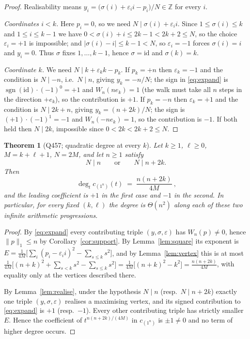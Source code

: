 \documentclass[11pt]{article}
\theoremstyle{plain}
\newtheorem{theorem}{Theorem}[section]
\theoremstyle{definition}
\theoremstyle{remark}
\newcommand{\Z}{\mathbb{Z}}
\newcommand{\onen}{(1^{n})}
\begin{document}
\begin{proof}
Realisability means $y_i=\bigl(\sigma(i)+\varepsilon_i i-p_i\bigr)/N\in\Z$ for every $i$.

\emph{Coordinates $i<k$.} Here $p_i=0$, so we need $N\mid\sigma(i)+\varepsilon_i i$.
Since $1\le\sigma(i)\le k$ and $1\le i\le k-1$ we have
$0<\sigma(i)+i\le 2k-1<2k+2\le N$, so the choice $\varepsilon_i=+1$ is impossible;
and $|\sigma(i)-i|\le k-1<N$, so $\varepsilon_i=-1$ forces $\sigma(i)=i$ and $y_i=0$.
Thus $\sigma$ fixes $1,\dots,k-1$, hence $\sigma=\mathrm{id}$ and $\sigma(k)=k$.

\emph{Coordinate $k$.} We need $N\mid k+\varepsilon_k k-p_k$.
If $p_k=+n$ then $\varepsilon_k=-1$ and the condition is $N\mid -n$, i.e.\ $N\mid n$,
giving $y_k=-n/N$; the sign in \eqref{eq:expand} is
$\operatorname{sgn}(\mathrm{id})\cdot(-1)^{0}=+1$ and $W_n(n e_k)=1$ (the walk must take
all $n$ steps in the direction $+e_k$), so the contribution is $+1$.
If $p_k=-n$ then $\varepsilon_k=+1$ and the condition is $N\mid 2k+n$, giving
$y_k=(n+2k)/N$; the sign is $(+1)\cdot(-1)^{1}=-1$ and $W_n(-ne_k)=1$, so the
contribution is $-1$.
If both held then $N\mid 2k$, impossible since $0<2k<2k+2\le N$.
\end{proof}

\begin{theorem}[Q457; quadratic degree at every $k$]\label{thm:B}
Let $k\ge1$, $\ell\ge0$, $M=k+\ell+1$, $N=2M$, and let $n\ge1$ satisfy
\[
  N\mid n\qquad\text{or}\qquad N\mid n+2k .
\]
Then
\[
  \boxed{\ \deg_t c_\onen(t)\;=\;\frac{n(n+2k)}{4M}\ },
\]
and the leading coefficient is $+1$ in the first case and $-1$ in the second. In
particular, for every fixed $(k,\ell)$ the degree is $\Theta(n^2)$ along each of these two
infinite arithmetic progressions.
\end{theorem}

\begin{proof}
By \eqref{eq:expand} every contributing triple $(y,\sigma,\varepsilon)$ has
$W_n(p)\ne0$, hence $\|p\|_1\le n$ by Corollary~\ref{cor:support}. By
Lemma~\ref{lem:square} its exponent is
$E=\frac1{4M}\bigl[\sum_i(p_i-\varepsilon_i i)^2-\sum_{s\le k}s^2\bigr]$, and by
Lemma~\ref{lem:vertex} this is at most
$\frac1{4M}\bigl[(n+k)^2+\sum_{s<k}s^2-\sum_{s\le k}s^2\bigr]
=\frac1{4M}\bigl[(n+k)^2-k^2\bigr]=\frac{n(n+2k)}{4M}$,
with equality only at the vertices described there.

By Lemma~\ref{lem:realise}, under the hypothesis $N\mid n$ (resp.\ $N\mid n+2k$) exactly
one triple $(y,\sigma,\varepsilon)$ realises a maximising vertex, and its signed
contribution to \eqref{eq:expand} is $+1$ (resp.\ $-1$). Every other contributing triple
has strictly smaller $E$. Hence the coefficient of $t^{n(n+2k)/(4M)}$ in $c_\onen$ is
$\pm1\ne0$ and no term of higher degree occurs.
\end{proof}
\end{document}
